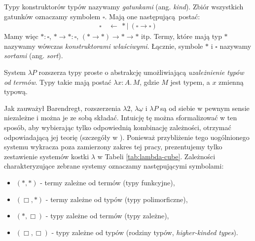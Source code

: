 Typy konstruktorów typów nazywamy \emph{gatunkami} (ang. \emph{kind}). Zbiór wszystkich gatunków oznaczamy symbolem \(\square\). Mają one następującą postać:
  \begin{align*}
    \square\ &\leftarrow\ \ast |\ (\square\to\square)
  \end{align*}
Mamy   więc    \(\ast:\square\),   \(\ast\to\ast    :   \square\),
\((\ast\to\ast)\to\ast\to\ast\)  itp.   Termy,  które   mają  typ
\(\ast\)  nazywamy   wówczas  \emph{konstruktorami  właściwymi}.
Łącznie, symbole \(\ast\)  i \(\square\) nazywamy \emph{sortami}
(ang. \emph{sort}).

System \(\lambda P\) rozszerza typy proste o abstrakcję umożliwiającą \emph{uzależnienie typów od termów}. Typy takie mają postać \(\lambda x:A.\,M\), gdzie \(M\) jest typem, a \(x\) zmienną typową. 

Jak zauważył Barendregt, rozszerzenia \(\lambda 2\), \(\lambda{\underline{\omega}}\) i \(\lambda P\) są od siebie w pewnym sensie niezależne i można je ze sobą składać. Intuicję tę można sformalizować  w ten sposób, aby wybierając tylko odpowiednią kombinację zależności, otrzymać odpowiadającą jej teorię (szczegóły w \cite{barendregt_1991}). Ponieważ przybliżenie tego uogólnionego systemu wykracza poza zamierzony zakres tej pracy, prezentujemy tylko zestawienie systemów kostki \(\lambda\) w Tabeli \ref{tab:lambda-cube}. Zależności charakteryzujące zebrane systemy oznaczamy następującymi symbolami:
\begin{itemize}
  \setlength\itemsep{0em}
  \item \((*,*)\) - termy zależne od termów (typy funkcyjne),
  \item \((\Box,*)\) - termy zależne od typów (typy polimorficzne),
  \item \((*,\Box)\) - typy zależne od termów (typy zależne),
  \item \((\Box, \Box)\) - typy zależne od typów (rodziny typów, \emph{higher-kinded types}).
\end{itemize}

